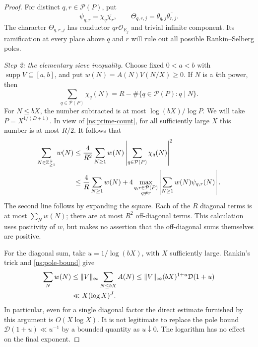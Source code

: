 \documentclass[11pt,reqno]{amsart}
\numberwithin{equation}{section}
\theoremstyle{definition}
\theoremstyle{remark}
\begin{document}
\begin{proof}
For distinct $q,r\in\mathcal P(P)$, put
\begin{equation}\label{ns:cross-character}
\psi_{q,r}=\chi_q\overline{\chi_r},\qquad
\Theta_{q,r,j}=\theta_{q,j}\overline{\theta_{r,j}}.
\end{equation}
The character $\Theta_{q,r,j}$ has conductor $qr\mathcal O_{E_j}$ and trivial infinite component. Its ramification at every place above $q$ and $r$ will rule out all possible Rankin--Selberg poles.

\emph{Step 2: the elementary sieve inequality.}
Choose fixed $0<a<b$ with $\operatorname{supp}V\subseteq[a,b]$, and put $w(N)=A(N)V(N/X)\ge0$. If $N$ is a $k$th power, then
\begin{equation}\label{ns:power-detector}
\sum_{q\in\mathcal P(P)}\chi_q(N)
=R-\#\{q\in\mathcal P(P):q\mid N\}.
\end{equation}
For $N\le bX$, the number subtracted is at most $\log(bX)/\log P$. We will take $P=X^{1/(D+1)}$. In view of \eqref{ns:prime-count}, for all sufficiently large $X$ this number is at most $R/2$. It follows that
\begin{align}
\sum_{N\in\mathbb Z_{\ge1}^{\,k}}w(N)
&\le\frac4{R^2}\sum_{N\ge1}w(N)
               \left|\sum_{q\in\mathcal P(P)}\chi_q(N)\right|^2\notag\\
&\le\frac4R\sum_{N\ge1}w(N)
 +4\max_{\substack{q,r\in\mathcal P(P)\\q\ne r}}
       \left|\sum_{N\ge1}w(N)\psi_{q,r}(N)\right|.
\label{ns:sieve-inequality}
\end{align}
The second line follows by expanding the square. Each of the $R$ diagonal terms is at most $\sum_Nw(N)$; there are at most $R^2$ off-diagonal terms. This calculation uses positivity of $w$, but makes no assertion that the off-diagonal sums themselves are positive.

For the diagonal sum, take $u=1/\log(bX)$, with $X$ sufficiently large. Rankin's trick and \eqref{ns:pole-bound} give
\begin{align}
\sum_Nw(N)&\le\|V\|_\infty\sum_{N\le bX}A(N)
 \le\|V\|_\infty(bX)^{1+u}\mathcal D(1+u)\notag\\
&\ll X(\log X)^J.
\label{ns:diagonal-bound}
\end{align}
In particular, even for a single diagonal factor the direct estimate furnished by this argument is $O(X\log X)$. It is not legitimate to replace the pole bound $\mathcal D(1+u)\ll u^{-1}$ by a bounded quantity as $u\downarrow0$. The logarithm has no effect on the final exponent.


\end{proof}
\end{document}
